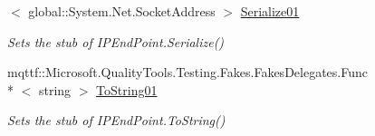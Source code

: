 \begin{DoxyCompactItemize}
$<$ global\-::\-System.\-Net.\-Socket\-Address $>$ \hyperlink{class_system_1_1_net_1_1_fakes_1_1_stub_i_p_end_point_a2dfddef5bb09e76298b6def943234d0e}{Serialize01}
\begin{DoxyCompactList}\small\item\em Sets the stub of I\-P\-End\-Point.\-Serialize()\end{DoxyCompactList}\item 
mqttf\-::\-Microsoft.\-Quality\-Tools.\-Testing.\-Fakes.\-Fakes\-Delegates.\-Func\\*
$<$ string $>$ \hyperlink{class_system_1_1_net_1_1_fakes_1_1_stub_i_p_end_point_aff9f3387089c89a61eb21f322878601b}{To\-String01}
\begin{DoxyCompactList}\small\item\em Sets the stub of I\-P\-End\-Point.\-To\-String()\end{DoxyCompactList}\end{DoxyCompactItemize}
